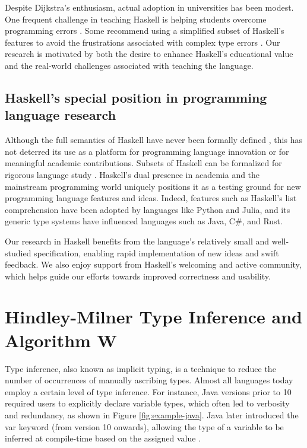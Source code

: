 Despite Dijkstra's enthusiasm, actual adoption in universities has been modest. One frequent challenge in teaching Haskell is helping students overcome programming errors \cite{Jun2000-yu, Tirronen2015-nr}. Some recommend using a simplified subset of Haskell's features to avoid the frustrations associated with complex type errors \cite{Heeren2003-mz}. Our research is motivated by both the desire to enhance Haskell's educational value and the real-world challenges associated with teaching the language.

\subsection{Haskell's special position in programming language research}

Although the full semantics of Haskell have never been formally defined \cite{Hudak2007-kn}, this has not deterred its use as a platform for programming language innovation or for meaningful academic contributions. Subsets of Haskell can be formalized for rigorous language study \cite{FaxEn2002-nd}. Haskell's dual presence in academia and the mainstream programming world uniquely positions it as a testing ground for new programming language features and ideas. Indeed, features such as Haskell's list comprehension have been adopted by languages like Python and Julia, and its generic type systems have influenced languages such as Java, C\#, and Rust.

Our research in Haskell benefits from the language's relatively small and well-studied specification, enabling rapid implementation of new ideas and swift feedback. We also enjoy support from Haskell's welcoming and active community, which helps guide our efforts towards improved correctness and usability.

\section{Hindley-Milner Type Inference and Algorithm W}

Type inference, also known as implicit typing, is a technique to reduce the number of occurrences of manually ascribing types. Almost all languages today employ a certain level of type inference. For instance, Java versions prior to 10 required users to explicitly declare variable types, which often led to verbosity and redundancy, as shown in Figure \ref{fig:example-java}. Java later introduced the var keyword (from version 10 onwards), allowing the type of a variable to be inferred at compile-time based on the assigned value \cite{noauthor_undated-an}.  


